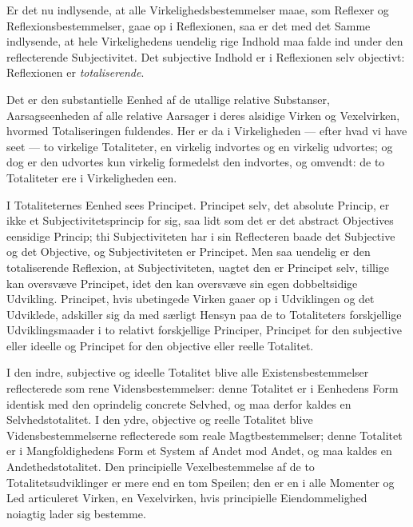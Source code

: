 \documentclass[11pt]{book}
\newcommand{\opage}[1]{\marginnote{\footnotesize\textit{[#1]}}}
\begin{document}
\opage{125} \setcounter{footnote}{0}%
Er det nu indlysende, at alle Virkelighedsbestemmelser maae, som Reflexer og
Reflexionsbestemmelser, gaae op i Reflexionen, saa er det med det Samme
indlysende, at hele Virkelighedens uendelig rige Indhold maa falde ind under
den reflecterende Subjectivitet. Det subjective Indhold er i Reflexionen selv
objectivt: Reflexionen er \emph{totaliserende}.

Det er den substantielle Eenhed af de utallige relative Substanser,
Aarsagseenheden af alle relative Aarsager i deres alsidige Virken og
Vexelvirken, hvormed Totaliseringen fuldendes. Her er da i Virkeligheden ---
efter hvad vi have seet --- to virkelige Totaliteter, en virkelig indvortes og
en virkelig udvortes; og dog er den udvortes kun virkelig formedelst den
indvortes, og omvendt: de to Totaliteter ere i Virkeligheden een.

I Totaliteternes Eenhed sees Principet. Principet selv, det absolute Princip,
er ikke et Subjectivitetsprincip for sig, saa lidt som det er det abstract
Objectives eensidige Princip; thi Subjectiviteten har i sin Reflecteren baade
det Subjective og det Objective, og Subjectiviteten er Principet. Men saa
uendelig er den totaliserende Reflexion, at Subjectiviteten,
\opage{126} \setcounter{footnote}{0}%
uagtet den er Principet selv, tillige kan oversvæve Principet, idet den kan
oversvæve sin egen dobbeltsidige Udvikling. Principet, hvis ubetingede Virken
gaaer op i Udviklingen og det Udviklede, adskiller sig da med særligt Hensyn
paa de to Totaliteters forskjellige Udviklingsmaader i to relativt
forskjellige Principer, Principet for den subjective eller ideelle og
Principet for den objective eller reelle Totalitet.

I den indre, subjective og ideelle Totalitet blive alle
Existensbestemmelser reflecterede som rene Vidensbestemmelser: denne Totalitet
er i Eenhedens Form identisk med den oprindelig concrete Selvhed, og maa
derfor kaldes en Selvhedstotalitet. I den ydre, objective og reelle Totalitet
blive Vidensbestemmelserne reflecterede som reale Magtbestemmelser; denne
Totalitet er i Mangfoldighedens Form et System af Andet mod Andet, og maa
kaldes en Andethedstotalitet. Den principielle Vexelbestemmelse af de to
Totalitetsudviklinger er mere end en tom Speilen; den er en i alle Momenter og
Led articuleret Virken, en Vexelvirken, hvis principielle Eiendommelighed
noiagtig lader sig bestemme.
\end{document}
